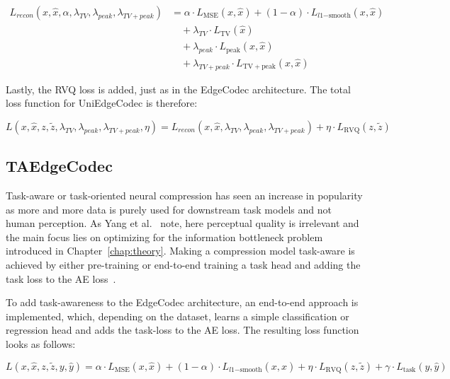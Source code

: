 \begin{equation}
\begin{split}
L_{recon}(x, \hat{x}, \alpha, \lambda_{TV}, \lambda_{peak}, \lambda_{TV+peak}) &= \alpha \cdot L_\mathrm{MSE}(x, \hat{x}) + (1 - \alpha) \cdot L_{l1\mathrm{-smooth}}(x, \hat{x}) \\
&\quad + \lambda_{TV} \cdot L_\mathrm{TV}(\hat{x}) \\
&\quad + \lambda_{peak} \cdot L_\mathrm{peak}(x, \hat{x}) \\
&\quad + \lambda_{TV+peak} \cdot L_\mathrm{TV+peak}(x, \hat{x})
\end{split}
\end{equation}

Lastly, the RVQ loss is added, just as in the EdgeCodec architecture. The total loss function for UniEdgeCodec is therefore: 

\begin{equation}
L(x, \hat{x}, z, \tilde{z}, \lambda_{TV}, \lambda_{peak}, \lambda_{TV+peak}, \eta) = L_{recon}(x, \hat{x}, \lambda_{TV}, \lambda_{peak}, \lambda_{TV+peak}) + \eta \cdot L_\mathrm{RVQ}(z, \tilde{z}) 
\end{equation}

\subsection{TAEdgeCodec}

Task-aware or task-oriented neural compression has seen an increase in popularity as more and more data is purely used for downstream task models and not human perception. As Yang et al.~\cite{Yang2022} note, here perceptual quality is irrelevant and the main focus lies on optimizing for the information bottleneck problem introduced in Chapter~\ref{chap:theory}. Making a compression model task-aware is achieved by either pre-training or end-to-end training a task head and adding the task loss to the AE loss~\cite{Song2021, Yang2022}. 

To add task-awareness to the EdgeCodec architecture, an end-to-end approach is implemented, which, depending on the dataset, learns a simple classification or regression head and adds the task-loss to the AE loss. The resulting loss function looks as follows: 

\begin{equation}
L(x, \hat{x}, z, \tilde{z}, y, \hat{y}) = \alpha \cdot L_\mathrm{MSE}(x, \hat{x}) + (1 - \alpha) \cdot L_{l1\mathrm{-smooth}}(x, \hat{x}) + \eta \cdot L_\mathrm{RVQ}(z, \tilde{z}) + \gamma \cdot L_\mathrm{task}(y, \hat{y})
\end{equation}


